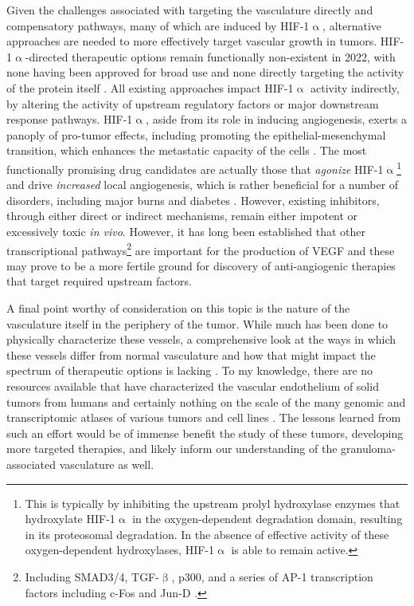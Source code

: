 Given the challenges associated with targeting the vasculature directly and compensatory pathways, many of which are induced by HIF\hyp{}1$\upalpha$, alternative approaches are needed to more effectively target vascular growth in tumors. HIF\hyp{}1$\upalpha$\hyp{}directed therapeutic options remain functionally non\hyp{}existent in 2022, with none having been approved for broad use and none directly targeting the activity of the protein itself \citep{Sharma2022}. All existing approaches impact HIF\hyp{}1$\upalpha$ activity indirectly, by altering the activity of upstream regulatory factors or major downstream response pathways. HIF\hyp{}1$\upalpha$, aside from its role in inducing angiogenesis, exerts a panoply of pro\hyp{}tumor effects, including promoting the epithelial\hyp{}mesenchymal transition, which enhances the metastatic capacity of the cells \citep{Sharma2022}. The most functionally promising drug candidates are actually those that \textit{agonize} HIF\hyp{}1$\upalpha$\footnote{This is typically by inhibiting the upstream prolyl hydroxylase enzymes that hydroxylate HIF\hyp{}1$\upalpha$ in the oxygen\hyp{}dependent degradation domain, resulting in its proteosomal degradation. In the absence of effective activity of these oxygen\hyp{}dependent hydroxylases, HIF\hyp{}1$\upalpha$ is able to remain active.} and drive \textit{increased} local angiogenesis, which is rather beneficial for a number of disorders, including major burns and diabetes \citep{Dor2002, DeRosa2018, Atluri2008}. However, existing inhibitors, through either direct or indirect mechanisms, remain either impotent or excessively toxic \textit{in vivo}. However, it has long been established that other transcriptional pathways\footnote{Including SMAD3/4, TGF\hyp{}$\upbeta$, p300, and a series of AP\hyp{}1 transcription factors including c\hyp{}Fos and Jun\hyp{}D \citep{Jeon2006, Nam2010, Gray2005, Kwon2012, Thangarajah2009, Marconcini1999, Schmidt2007, Catar2013, Yoshitomi2021}.} are important for the production of VEGF and these may prove to be a more fertile ground for discovery of anti\hyp{}angiogenic therapies that target required upstream factors.

A final point worthy of consideration on this topic is the nature of the vasculature itself in the periphery of the tumor. While much has been done to physically characterize these vessels, a comprehensive look at the ways in which these vessels differ from normal vasculature and how that might impact the spectrum of therapeutic options is lacking \citep{Jambusaria2020}. To my knowledge, there are no resources available that have characterized the vascular endothelium of solid tumors from humans and certainly nothing on the scale of the many genomic and transcriptomic atlases of various tumors and cell lines \citep{Kahn2021, Carlson2021, Pepin2012}. The lessons learned from such an effort would be of immense benefit the study of these tumors, developing more targeted therapies, and likely inform our understanding of the granuloma\hyp{}associated vasculature as well.

